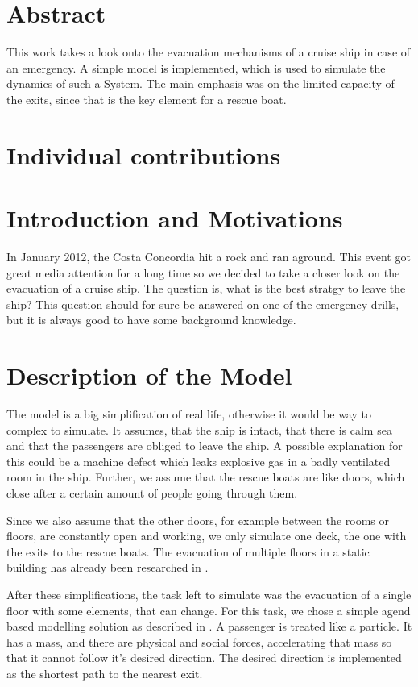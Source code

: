 \documentclass[11pt]{article}
\begin{document}
\section{Abstract}

This work takes a look onto the evacuation mechanisms of a cruise ship in case of an emergency.
A simple model is implemented, which is used to simulate the dynamics of such a System. 
The main emphasis was on the limited capacity of the exits, since that is the key element for a
rescue boat. 


\section{Individual contributions}

\section{Introduction and Motivations}
In January 2012, the Costa Concordia hit a rock and ran aground\cite{bbcnews}.
This event got great media attention for a long time so we decided to take a closer look
on the evacuation of a cruise ship. The question is, what is the best stratgy to leave the ship?
This question should for sure be answered on one of the emergency drills, but it is always good 
to have some background knowledge.

\section{Description of the Model}

The model is a big simplification of real life, otherwise it would be way to complex to simulate.
It assumes, that the ship is intact, that there is calm sea and that the passengers are obliged to leave the ship. 
A possible explanation for this could be a machine defect which leaks explosive gas in a badly ventilated room in the ship. Further, we assume that the rescue boats are like doors, which close after a certain amount of people going through them. 

Since we also assume that the other doors, for example between the rooms or floors, are constantly open and working, we only simulate one deck, the one with the exits to the rescue boats.
The evacuation of multiple floors in a static building has already been researched in \cite{multilevel}. 

After these simplifications, the task left to simulate was the evacuation of a single floor with some elements, that can change.
For this task, we chose a simple agend based modelling solution as described in \cite{helbing}.
A passenger is treated like a particle. It has a mass, and there are physical and social forces, accelerating that mass so that it cannot follow it's desired direction.
The desired direction is implemented as the shortest path to the nearest exit.
\end{document}
